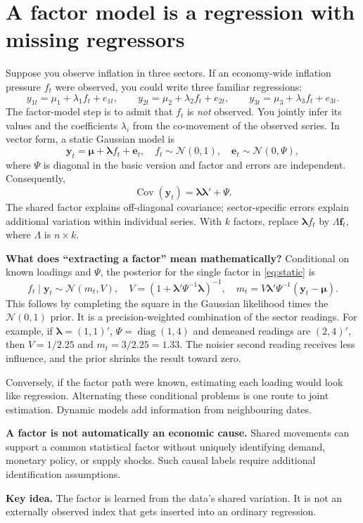 \documentclass[11pt,a4paper]{article}
\newcommand{\Cov}{\operatorname{Cov}}
\newcommand{\N}{\mathcal N}
\newcommand{\diag}{\operatorname{diag}}
\newcommand{\takeaway}[1]{\par\medskip\noindent\colorbox{pale}{\parbox{\dimexpr\linewidth-2\fboxsep}{\textbf{Key idea.} #1}}\par\medskip}
\begin{document}
\section{A factor model is a regression with missing regressors}
Suppose you observe inflation in three sectors. If an economy-wide inflation pressure $f_t$ were observed, you could write three familiar regressions:
\[
y_{1t}=\mu_1+\lambda_1 f_t+e_{1t},\qquad
y_{2t}=\mu_2+\lambda_2 f_t+e_{2t},\qquad
y_{3t}=\mu_3+\lambda_3 f_t+e_{3t}.
\]
The factor-model step is to admit that $f_t$ is \emph{not} observed. You jointly infer its values and the coefficients $\lambda_i$ from the co-movement of the observed series. In vector form, a static Gaussian model is
\begin{equation}
\mathbf y_t=\boldsymbol\mu+\boldsymbol\lambda f_t+\mathbf e_t,
\quad f_t\sim\N(0,1),\quad \mathbf e_t\sim\N(0,\Psi),
\label{eq:static}
\end{equation}
where $\Psi$ is diagonal in the basic version and factor and errors are independent. Consequently,
\[
\Cov(\mathbf y_t)=\boldsymbol\lambda\boldsymbol\lambda'+\Psi.
\]
The shared factor explains off-diagonal covariance; sector-specific errors explain additional variation within individual series. With $k$ factors, replace $\boldsymbol\lambda f_t$ by $\Lambda\mathbf f_t$, where $\Lambda$ is $n\times k$.

\textbf{What does ``extracting a factor'' mean mathematically?} Conditional on known loadings and $\Psi$, the posterior for the single factor in \eqref{eq:static} is
\[
f_t\mid\mathbf y_t\sim\N(m_t,V),\quad
V=(1+\boldsymbol\lambda'\Psi^{-1}\boldsymbol\lambda)^{-1},\quad
m_t=V\boldsymbol\lambda'\Psi^{-1}(\mathbf y_t-\boldsymbol\mu).
\]
This follows by completing the square in the Gaussian likelihood times the $\N(0,1)$ prior. It is a precision-weighted combination of the sector readings. For example, if $\boldsymbol\lambda=(1,1)'$, $\Psi=\diag(1,4)$ and demeaned readings are $(2,4)'$, then $V=1/2.25$ and $m_t=3/2.25=1.33$. The noisier second reading receives less influence, and the prior shrinks the result toward zero.

Conversely, if the factor path were known, estimating each loading would look like regression. Alternating these conditional problems is one route to joint estimation. Dynamic models add information from neighbouring dates.

\textbf{A factor is not automatically an economic cause.} Shared movements can support a common statistical factor without uniquely identifying demand, monetary policy, or supply shocks. Such causal labels require additional identification assumptions.
\takeaway{The factor is learned from the data's shared variation. It is not an externally observed index that gets inserted into an ordinary regression.}
\end{document}
